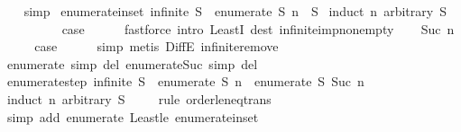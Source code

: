 \begin{isabellebody}
%
\isadelimproof
\ \ %
\endisadelimproof
%
\isatagproof
{}\isamarkupfalse%
\ simp%
\endisatagproof
{\isafoldproof}%
%
\isadelimproof
\isanewline
%
\endisadelimproof
\isanewline
{}\isamarkupfalse%
\ enumerate{\isacharunderscore}in{\isacharunderscore}set{\isacharcolon}\ {\isachardoublequoteopen}infinite\ S\ {\isasymLongrightarrow}\ enumerate\ S\ n\ {\isasymin}\ S{\isachardoublequoteclose}\isanewline
%
\isadelimproof
%
\endisadelimproof
%
\isatagproof
{}\isamarkupfalse%
\ {\isacharparenleft}induct\ n\ arbitrary{\isacharcolon}\ S{\isacharparenright}\isanewline
\ \ \isamarkupfalse%
\ {}\isanewline
\ \ \isamarkupfalse%
\ \isamarkupfalse%
\ {\isacharquery}case\isanewline
\ \ \ \ \isamarkupfalse%
\ {\isacharparenleft}fastforce\ intro{\isacharcolon}\ LeastI\ dest{\isacharbang}{\isacharcolon}\ infinite{\isacharunderscore}imp{\isacharunderscore}nonempty{\isacharparenright}\isanewline
{}\isamarkupfalse%
\isanewline
\ \ \isamarkupfalse%
\ {\isacharparenleft}Suc\ n{\isacharparenright}\isanewline
\ \ \isamarkupfalse%
\ \isamarkupfalse%
\ {\isacharquery}case\isanewline
\ \ \ \ \isamarkupfalse%
\ simp\ {\isacharparenleft}metis\ DiffE\ infinite{\isacharunderscore}remove{\isacharparenright}\isanewline
{}\isamarkupfalse%
%
\endisatagproof
{\isafoldproof}%
%
\isadelimproof
\isanewline
%
\endisadelimproof
\isanewline
{}\isamarkupfalse%
\ enumerate{\isacharunderscore}{}\ {\isacharbrackleft}simp\ del{\isacharbrackright}\ enumerate{\isacharunderscore}Suc\ {\isacharbrackleft}simp\ del{\isacharbrackright}\isanewline
\isanewline
{}\isamarkupfalse%
\ enumerate{\isacharunderscore}step{\isacharcolon}\ {\isachardoublequoteopen}infinite\ S\ {\isasymLongrightarrow}\ enumerate\ S\ n\ {\isacharless}\ enumerate\ S\ {\isacharparenleft}Suc\ n{\isacharparenright}{\isachardoublequoteclose}\isanewline
%
\isadelimproof
\ \ %
\endisadelimproof
%
\isatagproof
{}\isamarkupfalse%
\ {\isacharparenleft}induct\ n\ arbitrary{\isacharcolon}\ S{\isacharparenright}\isanewline
\ \ \ \isamarkupfalse%
\ {\isacharparenleft}rule\ order{\isacharunderscore}le{\isacharunderscore}neq{\isacharunderscore}trans{\isacharparenright}\isanewline
\ \ \ \ \isamarkupfalse%
\ {\isacharparenleft}simp\ add{\isacharcolon}\ enumerate{\isacharunderscore}{}\ Least{\isacharunderscore}le\ enumerate{\isacharunderscore}in{\isacharunderscore}set{\isacharparenright}\isanewline

\end{isabellebody}
